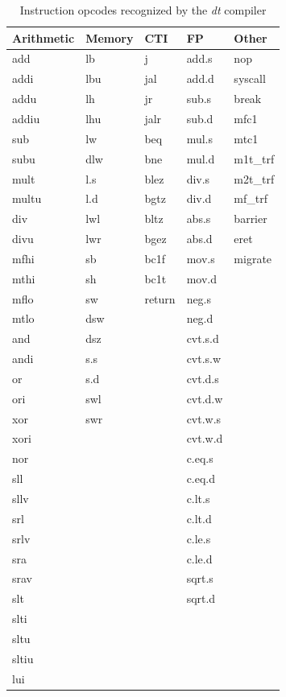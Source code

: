 \begin{table}
\centering
\caption{Instruction opcodes recognized by the \emph{dt} compiler}
\begin{tabular}{|l|l|l|l|l|}
\hline
\textbf{Arithmetic} & \textbf{Memory} & \textbf{CTI} & \textbf{FP} & \textbf{Other} \\ \hline \hline
add & lb & j & add.s & nop \\ \hline
addi & lbu & jal & add.d & syscall \\ \hline
addu & lh & jr & sub.s & break \\ \hline
addiu & lhu & jalr & sub.d & mfc1 \\ \hline
sub & lw & beq & mul.s & mtc1 \\ \hline
subu & dlw & bne & mul.d & m1t\_trf \\ \hline
mult & l.s & blez & div.s & m2t\_trf \\ \hline
multu & l.d & bgtz & div.d & mf\_trf \\ \hline
div & lwl & bltz & abs.s & barrier \\ \hline
divu & lwr & bgez & abs.d & eret \\ \hline
mfhi & sb & bc1f & mov.s & migrate \\ \hline
mthi & sh & bc1t & mov.d &  \\ \hline
mflo & sw & return & neg.s &  \\ \hline
mtlo & dsw & & neg.d &  \\ \hline
and & dsz & & cvt.s.d &  \\ \hline
andi & s.s & & cvt.s.w &  \\ \hline
or & s.d & & cvt.d.s &  \\ \hline
ori & swl & & cvt.d.w &  \\ \hline
xor & swr & & cvt.w.s &  \\ \hline
xori & & & cvt.w.d &  \\ \hline
nor & & & c.eq.s &  \\ \hline
sll & & & c.eq.d &  \\ \hline
sllv & & & c.lt.s &  \\ \hline
srl & & & c.lt.d &  \\ \hline
srlv & & & c.le.s &  \\ \hline
sra & & & c.le.d &  \\ \hline
srav & & & sqrt.s &  \\ \hline
slt & & & sqrt.d &  \\ \hline
slti & & & &  \\ \hline
sltu & & & &  \\ \hline
sltiu & & & &  \\ \hline
lui & & & &  \\ \hline
\end{tabular}
\label{tab:opcodes}
\end{table}

